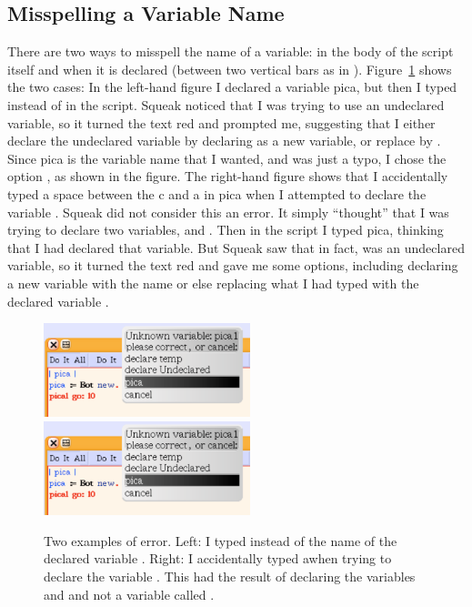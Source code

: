 \documentclass[a4paper,10pt,twoside]{book}
\begin{document}
\subsection{Misspelling a Variable Name}
There are two ways to misspell the name of a variable: in the body of the script itself and when 
it is declared (between two vertical bars as in ). Figure~\ref{fig:twoErrors} shows the two cases: In the left-hand figure I declared a variable pica, but then I typed  instead of  in the script. 
Squeak noticed that I was trying to use an undeclared variable, so it turned the text red and 
prompted me, suggesting that I either declare the undeclared variable by declaring  as 
a new variable, or replace  by . Since pica is the variable name that I wanted, and 
 was just a typo, I chose the option , as shown in the figure. The right-hand figure 
shows that I accidentally typed a space between the c and a in pica when I attempted to 
declare the variable . Squeak did not consider this an error. It simply “thought” that I was 
trying to declare two variables,  and . Then in the script I typed pica, thinking that I had 
declared that variable. But Squeak saw that in fact,  was an undeclared variable, so it 
turned the text red and gave me some options, including declaring a new variable with the 
name  or else replacing what I had typed with the declared variable . 

\begin{figure}[ht!]
\begin{center}\includegraphics[width=6cm]{mispellVariable}\includegraphics[width=6cm]{mispellVariable}
\caption{Two examples of error. Left: I typed  instead of the name of the declared variable 
. Right: I accidentally typed  awhen trying to declare the variable . This had the 
result of declaring the variables  and  and not a variable called . \label{fig:twoErrors}}\end{center}
\end{figure}
\end{document}
